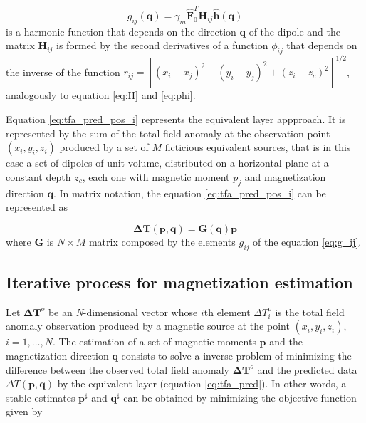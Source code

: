 \begin{equation}
g_{ij} (\mathbf{q})  = \gamma_m \hat{\mathbf{F}}_0^T \mathbf{H}_{ij} \hat{\mathbf{h}}(\mathbf{q})
\label{eq:g_ij}
\end{equation}
is a harmonic function that depends on the direction $\mathbf{q}$ of the dipole and the matrix $\mathbf{H}_{ij}$ is formed by the second derivatives of a function $\phi_{ij}$ that depends on the inverse of the function $r_{ij} = [(x_i-x_j)^2 + (y_i-y_j)^2 + (z_i-z_c)^2]^{1/2}$, analogously to equation \ref{eq:H} and \ref{eq:phi}.

Equation \ref{eq:tfa_pred_pos_i} represents the equivalent layer appproach. It is represented by the sum of the total field anomaly at the observation point $(x_i,y_i,z_i)$ produced by a set of $M$ ficticious equivalent sources, that is in this case a set of dipoles of unit volume, distributed on a horizontal plane at a constant depth $z_c$, each one with magnetic moment $p_j$ and magnetization direction $\mathbf{q}$. In matrix notation, the equation \ref{eq:tfa_pred_pos_i} can be represented as 

\begin{equation}
 \mathbf{\Delta T} (\mathbf{p}, \mathbf{q}) = \mathbf{G}(\mathbf{q}) \mathbf{p}
\label{eq:tfa_pred}
\end{equation}
where $\mathbf{G}$ is $N \times M$ matrix composed by the elements $g_{ij}$ of the equation \ref{eq:g_ij}.


\subsection{Iterative process for magnetization estimation}

Let $\mathbf{\Delta T}^o$ be an \textit{N}-dimensional vector whose $i$th element $\Delta T_i^o$ is the total field anomaly observation produced by a magnetic source at the point $(x_i,y_i,z_i)$, $i = 1, \ldots, N$. The estimation of a set of magnetic moments $\mathbf{p}$ and the magnetization direction $\mathbf{q}$ consists to solve a inverse problem of minimizing the difference between the observed total field anomaly $\mathbf{\Delta T}^o$ and the predicted data $\Delta T (\mathbf{p}, \mathbf{q})$ by the equivalent layer (equation \ref{eq:tfa_pred}). In other words, a stable estimates $\mathbf{p}^\sharp$ and $\mathbf{q}^\sharp$ can be obtained by minimizing the objective function given by

